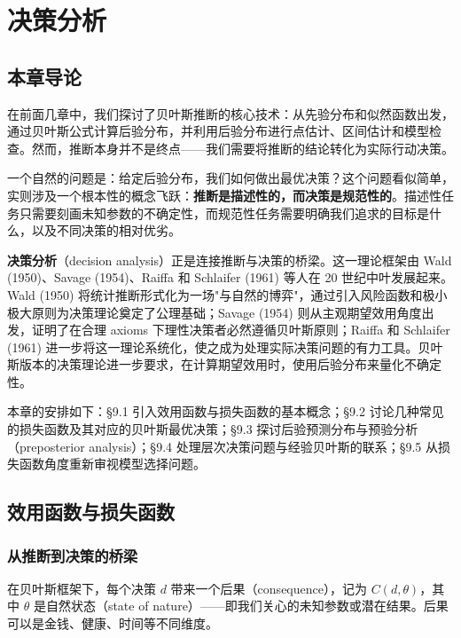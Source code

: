 
\chapter{决策分析}

\section{本章导论}

在前面几章中，我们探讨了贝叶斯推断的核心技术：从先验分布和似然函数出发，通过贝叶斯公式计算后验分布，并利用后验分布进行点估计、区间估计和模型检查。然而，推断本身并不是终点——我们需要将推断的结论转化为实际行动决策。

一个自然的问题是：给定后验分布，我们如何做出最优决策？这个问题看似简单，实则涉及一个根本性的概念飞跃：\textbf{推断是描述性的，而决策是规范性的}。描述性任务只需要刻画未知参数的不确定性，而规范性任务需要明确我们追求的目标是什么，以及不同决策的相对优劣。

\textbf{决策分析}（decision analysis）正是连接推断与决策的桥梁。这一理论框架由 Wald (1950)、Savage (1954)、Raiffa 和 Schlaifer (1961) 等人在 20 世纪中叶发展起来。Wald (1950) 将统计推断形式化为一场"与自然的博弈"，通过引入风险函数和极小极大原则为决策理论奠定了公理基础；Savage (1954) 则从主观期望效用角度出发，证明了在合理 axioms 下理性决策者必然遵循贝叶斯原则；Raiffa 和 Schlaifer (1961) 进一步将这一理论系统化，使之成为处理实际决策问题的有力工具。贝叶斯版本的决策理论进一步要求，在计算期望效用时，使用后验分布来量化不确定性。

本章的安排如下：\S 9.1 引入效用函数与损失函数的基本概念；\S 9.2 讨论几种常见的损失函数及其对应的贝叶斯最优决策；\S 9.3 探讨后验预测分布与预验分析（preposterior analysis）；\S 9.4 处理层次决策问题与经验贝叶斯的联系；\S 9.5 从损失函数角度重新审视模型选择问题。

\section{效用函数与损失函数}

\subsection{从推断到决策的桥梁}

在贝叶斯框架下，每个决策 $d$ 带来一个后果（consequence），记为 $C(d, \theta)$，其中 $\theta$ 是自然状态（state of nature）——即我们关心的未知参数或潜在结果。后果可以是金钱、健康、时间等不同维度。

